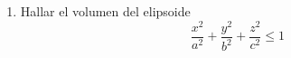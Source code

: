 \documentclass{article}
\begin{document}
\begin{enumerate}
{        %







        }

        \item {
            Hallar el volumen del elipsoide
            \[
                \frac{x^2}{a^2}+\frac{y^2}{b^2}+\frac{z^2}{c^2}\leq 1
            \]

}
\end{enumerate}
\end{document}
